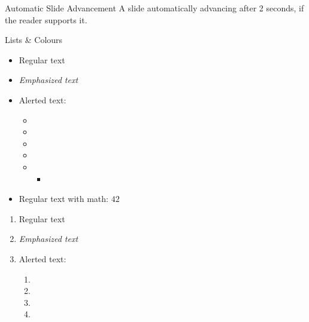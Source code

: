 \documentclass[aspectratio=169,12pt]{beamer}%
\begin{document}
    \begin{frame}{Automatic Slide Advancement}
        \onecolumneven%
        {%
            A slide automatically advancing after 2 seconds, if the reader supports it.
        }%
    \end{frame}



    \begin{frame}{Lists \& Colours}
        \threecolumneven%
        {%
            \begin{itemize}
                \item Regular text
                \item \emph{Emphasized text}
                \item Alerted text:
                \begin{itemize}
                    \item {}%
                    \item {}%
                    \item {}%
                    \item {}%
                    \item {}%
                    \begin{itemize}
                        \item {}
                    \end{itemize}
                \end{itemize}
                \item Regular text with math: $42$%
            \end{itemize}
        }%
        {%
            \begin{enumerate}
                \item Regular text
                \item \emph{Emphasized text}
                \item Alerted text:
                \begin{enumerate}
                    \item {}%
                    \item {}%
                    \item {}%
                    \item {}%

\end{enumerate}
\end{enumerate}}
\end{frame}
\end{document}
